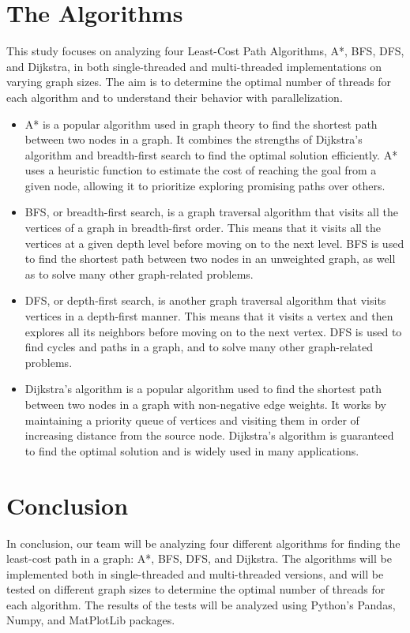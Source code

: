 \documentclass{article}
\begin{document}
\section{The Algorithms}
This study focuses on analyzing four Least-Cost Path Algorithms, A*, BFS, DFS, and Dijkstra, in both single-threaded and multi-threaded implementations on varying graph sizes. The aim is to determine the optimal number of threads for each algorithm and to understand their behavior with parallelization.
\begin{itemize}
    \item A* is a popular algorithm used in graph theory to find the shortest path between two nodes in a graph. It combines the strengths of Dijkstra's algorithm and breadth-first search to find the optimal solution efficiently. A* uses a heuristic function to estimate the cost of reaching the goal from a given node, allowing it to prioritize exploring promising paths over others.
    \item BFS, or breadth-first search, is a graph traversal algorithm that visits all the vertices of a graph in breadth-first order. This means that it visits all the vertices at a given depth level before moving on to the next level. BFS is used to find the shortest path between two nodes in an unweighted graph, as well as to solve many other graph-related problems.
    \item DFS, or depth-first search, is another graph traversal algorithm that visits vertices in a depth-first manner. This means that it visits a vertex and then explores all its neighbors before moving on to the next vertex. DFS is used to find cycles and paths in a graph, and to solve many other graph-related problems.
    \item Dijkstra's algorithm is a popular algorithm used to find the shortest path between two nodes in a graph with non-negative edge weights. It works by maintaining a priority queue of vertices and visiting them in order of increasing distance from the source node. Dijkstra's algorithm is guaranteed to find the optimal solution and is widely used in many applications.
\end{itemize}
\section{Conclusion}
In conclusion, our team will be analyzing four different algorithms for finding the least-cost path in a graph: A*, BFS, DFS, and Dijkstra. The algorithms will be implemented both in single-threaded and multi-threaded versions, and will be tested on different graph sizes to determine the optimal number of threads for each algorithm. The results of the tests will be analyzed using Python's Pandas, Numpy, and MatPlotLib packages.
\end{document}
